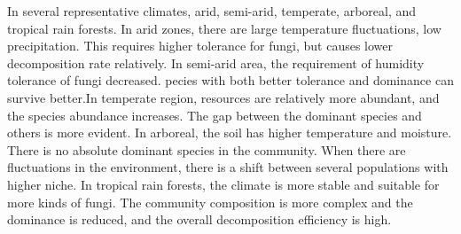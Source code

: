 \documentclass{mcmthesis}
\begin{document}
\begin{appendices}


In several representative climates, arid, semi-arid, temperate, arboreal, and tropical rain forests. In arid zones, there are large temperature fluctuations, low precipitation. This requires higher tolerance for fungi, but causes lower decomposition rate relatively. In semi-arid area, the requirement of humidity tolerance of fungi decreased. pecies with both better tolerance and dominance can survive better.In temperate region, resources are relatively more abundant, and the species abundance increases. The gap between the dominant species and others is more evident. In arboreal,  the soil has higher temperature and moisture. There is no absolute dominant species in the community. When there are fluctuations in the environment, there is a shift between several populations with higher niche. In tropical rain forests, the climate is more stable and suitable for more kinds of fungi. The community composition is more complex and the dominance is reduced, and the overall decomposition efficiency is high.


\end{appendices}
\end{document}

